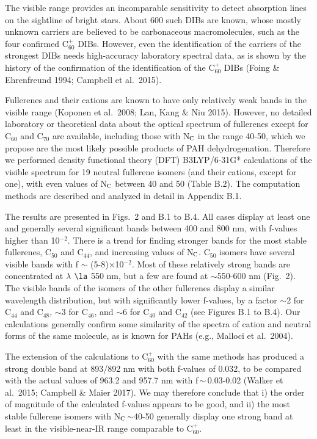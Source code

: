 \documentclass{aa}
\begin{document}
The visible range provides an incomparable sensitivity to detect absorption lines on the sightline of bright stars. About 600 such DIBs are known, 
whose mostly unknown carriers  are believed to be carbonaceous macromolecules, such as the four confirmed C$_{60}^+$ DIBs. However, even the identification of the carriers of the strongest DIBs needs high-accuracy laboratory spectral data, as is shown by the history of the confirmation of the identification of the C$_{60}^+$ DIBs (Foing \& Ehrenfreund 1994; Campbell 
et al.\ 2015). 

Fullerenes and their cations are known to have only relatively weak bands in the visible range (Koponen et al.\ 2008; Lan, Kang \& Niu 2015). 
However, no  detailed laboratory or theoretical data about the optical spectrum of fullerenes except for C$_{60}$ and C$_{70}$ are available, including those with N$_{\rm C}$ in the range 40-50, which we propose are the most likely possible products of PAH dehydrogenation.  Therefore we performed density functional theory (DFT) B3LYP/6-31G* calculations 
of the visible spectrum for 19 neutral fullerene isomers (and their cations, except for one), with even values of N$_{\rm C}$ between 40 and 50 (Table B.2).  The computation methods  are described and analyzed in detail in Appendix B.1. 

The results are presented in Figs.\ 2 and B.1 to B.4.
All cases display at least one and generally several significant bands between 400 and 800 nm, with f-values higher than 10$^{-2}$. There is a trend for finding stronger bands for the most stable fullerenes, C$_{50}$ and C$_{44}$, and increasing values of N$_{\rm C}$. C$_{50}$ isomers have several visible bands with f $\sim$ (5-8)$\times$10$^{-2}$. Most of these relatively strong bands are concentrated at $\lambda$ $\la$ 550 nm, but a 
few are found at $\sim$550-600 nm (Fig.\ 2). The visible bands of the isomers of the other fullerenes display a similar wavelength distribution, but with significantly lower f-values, by a factor $\sim$2 for C$_{44}$ and C$_{48}$, $\sim$3 for C$_{46}$, and  $\sim$6 for C$_{40}$ and  C$_{42}$ (see Figures B.1 to B.4). 
Our calculations  generally confirm some similarity of the spectra of cation and neutral forms of the same molecule, as is known for PAHs (e.g., Malloci et al.\  2004).

The extension of the calculations to C$_{60}^+$ with the same methods has
produced a strong double band at 893/892 nm with both f-values of 0.032, to be compared with the actual values of 963.2 and 957.7 nm with f\,$\sim$\,0.03-0.02 (Walker et al.\ 2015; Campbell \& Maier 2017). We may therefore conclude that i) the order of magnitude of the calculated f-values appears to be good, and ii) the most stable fullerene isomers with N$_{\rm C}$\,$\sim$40-50 generally display one strong band at least in the visible-near-IR range comparable to C$_{60}^+$.
\end{document}
